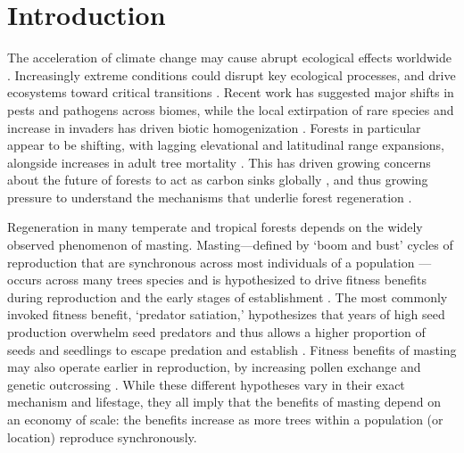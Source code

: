 \documentclass[11pt]{article}
\begin{document}
\section*{Introduction}

The acceleration of climate change may cause abrupt ecological effects worldwide \citep{Trisos2020}. Increasingly extreme conditions could disrupt key ecological processes, and drive ecosystems toward critical transitions \citep{Wernberg2016}. 
Recent work has suggested major shifts in pests and pathogens across biomes, while the local extirpation of rare species and increase in invaders has driven biotic homogenization \citep{Carlson2025, Dornelas2014, Daru2021}. Forests in particular appear to be shifting, with lagging elevational and latitudinal range expansions, alongside increases in adult tree mortality \citep{McDowell2020}. This has driven growing concerns about the future of forests to act as carbon sinks globally \citep{Albrich2020, Forzieri2022, McDowell2020}, and thus growing pressure to understand the mechanisms that underlie forest regeneration \citep{Foest2024, HacketPain2025, Chakraborty2024, Foest2026}. 

Regeneration in many temperate and tropical forests depends on the widely observed phenomenon of masting. Masting---defined by `boom and bust' cycles of reproduction that are synchronous across most individuals of a population \citep{Janzen1978}---occurs across many trees species and is hypothesized to drive fitness benefits during reproduction and the early stages of establishment \citep{Kelly1994, Bogdziewicz2024}. The most commonly invoked fitness benefit, `predator satiation,' hypothesizes that years of high seed production overwhelm seed predators and thus allows a higher proportion of seeds and seedlings to escape predation and establish \citep{Janzen1971, Kelly1994}. Fitness benefits of masting may also operate earlier in reproduction, by increasing pollen exchange and genetic outcrossing \citep{Carlson2014, Bontrager2019}. While these different hypotheses vary in their exact mechanism and lifestage, they all imply that the benefits of masting depend on an economy of scale: the benefits increase as more trees within a population (or location) reproduce synchronously.
\end{document}

